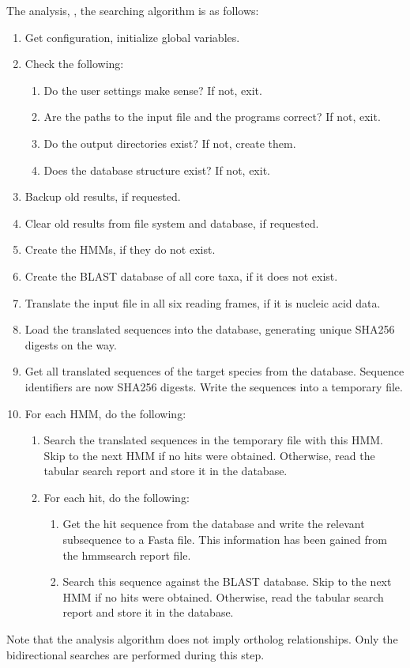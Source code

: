 The analysis, \ie, the searching algorithm is as follows:

\begin{enumerate}
	\item Get configuration, initialize global variables.
	\item Check the following:
	\begin{enumerate}
		\item Do the user settings make sense? If not, exit.
		\item Are the paths to the input file and the programs correct? If not,
			exit.
		\item Do the output directories exist? If not, create them.
		\item Does the database structure exist? If not, exit.
	\end{enumerate}
	\item Backup old results, if requested.
	\item Clear old results from file system and database, if requested.
	\item Create the HMMs, if they do not exist.
	\item Create the BLAST database of all core taxa, if it does not exist.
	\item Translate the input file in all six reading frames, if it is nucleic
		acid data.
	\item Load the translated sequences into the database, generating unique
		SHA256 digests on the way.
	\item Get all translated sequences of the target species from the database.
		Sequence identifiers are now SHA256 digests. Write the sequences into a
		temporary file.
	\item For each HMM, do the following:
	\begin{enumerate}
		\item Search the translated sequences in the temporary file with this HMM.
			Skip to the next HMM if no hits were obtained. Otherwise, read the tabular
			search report and store it in the database. 
		\item For each hit, do the following:
		\begin{enumerate}
			\item Get the hit sequence from the database and write the relevant
				subsequence to a Fasta file. This information has been gained from the
				hmmsearch report file.
			\item Search this sequence against the BLAST database. Skip to the next
				HMM if no hits were obtained. Otherwise, read the tabular search report
				and store it in the database. 
		\end{enumerate}
	\end{enumerate}
\end{enumerate}

Note that the analysis algorithm does not imply ortholog relationships. Only the
bidirectional searches are performed during this step. 
